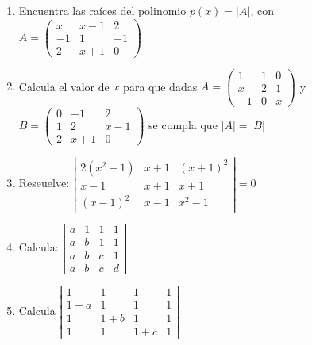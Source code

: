 \begin{enumerate}
\rightline{\textcolor{gris}{Solución: $\lambda=1\; \wedge \; \lambda =2$.}}

\item Encuentra las raíces del polinomio $p(x)=|A|$, con $A=\left( \begin{matrix} x&x-1&2\\-1&1&-1\\2&x+1&0 \end{matrix} \right)$
 
\rightline{\textcolor{gris}{Solución: $x=-1 \; \wedge \; x=4$.}}

\item Calcula el valor de $x$ para que dadas $A=\left( \begin{matrix}  1&1&0\\x&2&1\\-1&0&x\end{matrix} \right)$ y  $B=\left( \begin{matrix}  0&-1&2\\1&2&x-1\\2&x+1&0\end{matrix} \right)$ se cumpla que $|A|=|B|$

\rightline{\textcolor{gris}{Solución: $x=-1 \; \wedge \; x=3$.}}

\item Reseuelve: $\left| \begin{matrix} 2(x^2-1)&x+1&(x+1)^2\\x-1&x+1&x+1\\(x-1)^2&x-1&x^2-1 \end{matrix} \right|=0$

\hspace{-10mm} 

\vspace{2mm}

\rightline{\textcolor{gris}{Solución: $x=-1 \; \wedge \; x=0\; \wedge \, x= 1$.}}

\item Calcula: $\left| \begin{matrix} a&1&1&1\\a&b&1&1\\a&b&c&1\\a&b&c&d \end{matrix} \right|$

\rightline{\textcolor{gris}{Solución: $a(b-1)(c-1)(d-1)$ .}}

\item Calcula $ \left| \begin{matrix} 1&1&1&1\\1+a&1&1&1\\1&1+b&1&1\\1&1&1+c&1 \end{matrix} \right|$


\end{enumerate}
